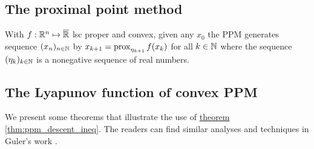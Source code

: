 \documentclass[12pt]{article}
\begin{document}
    \subsection{The proximal point method}
        With $f: \mathbb R^n \mapsto \overline {\mathbb R}$ lsc proper and convex, given any $x_0$ the PPM generates sequence $(x_n)_{n\in \mathbb N}$ by $x_{k + 1} = \operatorname{prox}_{\eta_{k + 1}}f(x_k)$ for all $k \in \mathbb N$ where the sequence $(\eta_{k})_{k \in \mathbb N}$ is a nonegative sequence of real numbers.
        

    \subsection{The Lyapunov function of convex PPM}
        We present some theorems that illustrate the use of \hyperref[thm:ppm_descent_ineq]{theorem \ref*{thm:ppm_descent_ineq}}. 
        The readers can find similar analyses and techniques in Guler's work \cite{guler_convergence_1991}. 
\end{document}
